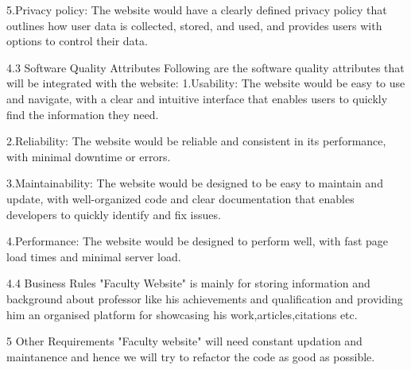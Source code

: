 5.Privacy policy: The website would have a clearly defined privacy policy that outlines how user data is collected, stored, and used, and provides users with options to control their data.

4.3 Software Quality Attributes
Following are the software quality attributes that will be integrated with the website:
1.Usability: The website would be easy to use and navigate, with a clear and intuitive interface that enables users to quickly find the information they need.

2.Reliability: The website would be reliable and consistent in its performance, with minimal downtime or errors.

3.Maintainability: The website would be designed to be easy to maintain and update, with well-organized code and clear documentation that enables developers to quickly identify and fix issues.

4.Performance: The website would be designed to perform well, with fast page load times and minimal server load.

4.4 Business Rules 
"Faculty Website" is mainly for storing information and background about professor like his achievements and qualification and providing him an organised platform for showcasing his work,articles,citations etc.

5 Other Requirements 
"Faculty website" will need constant updation and maintanence and hence we will try to refactor the code as good as possible.